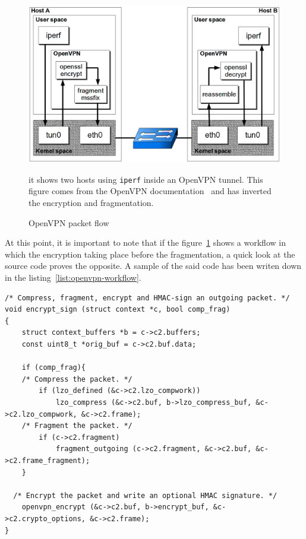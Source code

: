 \begin{figure}[ht]
\includegraphics[width=\textwidth]{OpenVPN-packetflow}
\caption{OpenVPN packet flow}{it shows two hosts using \texttt{iperf} inside an OpenVPN tunnel. This figure comes from the OpenVPN documentation~\cite{openvpn-doc-workflow} and has inverted the encryption and fragmentation.}
\label{fig:openvpn-packet-flow}
\end{figure}

\noindent At this point, it is important to note that if the figure~\ref{fig:openvpn-packet-flow} shows a workflow in which the encryption taking place before the fragmentation, a quick look at the source code proves the opposite.
A sample of the said code has been writen down in the listing~\ref{list:openvpn-workflow}.


\lstset{language=c}
\begin{lstlisting}[caption={openvpn compress then encrypt -- sample from \texttt{forward.c}. It clearly shows that the order of operations in the packet workflow is compression, then fragmentation and finally encryption.}, label=list:openvpn-workflow, float]% The 'float' option makes the listing unbreakable.
/* Compress, fragment, encrypt and HMAC-sign an outgoing packet. */
void encrypt_sign (struct context *c, bool comp_frag)
{
	struct context_buffers *b = c->c2.buffers;
	const uint8_t *orig_buf = c->c2.buf.data;

	if (comp_frag){
	/* Compress the packet. */
		if (lzo_defined (&c->c2.lzo_compwork))
			lzo_compress (&c->c2.buf, b->lzo_compress_buf, &c->c2.lzo_compwork, &c->c2.frame);
	/* Fragment the packet. */
		if (c->c2.fragment)
			fragment_outgoing (c->c2.fragment, &c->c2.buf, &c->c2.frame_fragment);
	}

  /* Encrypt the packet and write an optional HMAC signature. */
	openvpn_encrypt (&c->c2.buf, b->encrypt_buf, &c->c2.crypto_options, &c->c2.frame);
}
\end{lstlisting}


